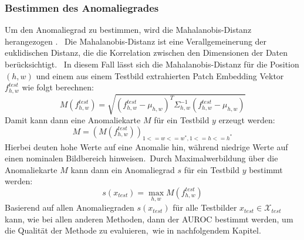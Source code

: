\subsubsection{Bestimmen des Anomaliegrades}
Um den Anomaliegrad zu bestimmen, wird die Mahalanobis-Distanz herangezogen \cite{mahalanobis1936generalized}. \
Die Mahalanobis-Distanz ist eine Verallgemeinerung der euklidischen Distanz, die die Korrelation zwischen den Dimensionen der Daten berücksichtigt. \
In diesem Fall lässt sich die Mahalanobis-Distanz für die Position $(h,w)$ und einem aus einem Testbild extrahierten Patch Embedding Vektor $f^{test}_{h,w}$ wie folgt berechnen: \
$$
M(f^{test}_{h,w}) = \sqrt{(f^{test}_{h,w} - \mu_{h,w})^{T} \Sigma_{h,w}^{-1} (f^{test}_{h,w} - \mu_{h,w})}
$$
Damit kann dann eine Anomaliekarte $M$ für ein Testbild $y$ erzeugt werden:
$$
M = (M(f^{test}_{h,w}))_{1<=w<=w^{*}, 1<=h<=h^{*}}
$$
Hierbei deuten hohe Werte auf eine Anomalie hin, während niedrige Werte auf einen nominalen Bildbereich hinweisen.\
Durch Maximalwerbildung über die Anomaliekarte $M$ kann dann ein Anomaliegrad $s$ für ein Testbild $y$ bestimmt werden:\
$$
s(x_{test}) = \max_{h,w} M(f^{test}_{h,w})
$$
Basierend auf allen Anomaliegraden $s(x_{test})$ für alle Testbilder $x_{test}\in\mathcal{X}_{test}$ kann, wie bei allen anderen Methoden, dann der AUROC bestimmt werden, um die Qualität der Methode zu evaluieren,\
wie in nachfolgendem Kapitel.\
